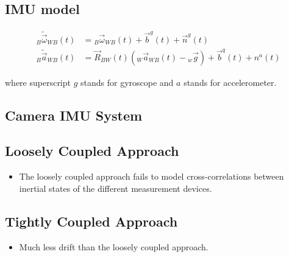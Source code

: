 \documentclass[10pt,a4paper]{scrartcl}
\begin{document}
\begin{multicols*}{2}
\subsection{IMU model}

\begin{align*}
{}_B\tilde{\vec{\omega}}_{WB}(t)&={}_B\vec{\omega}_{WB}(t)+\vec{b}^g(t)+\vec{n}^g(t)\\
{}_B\tilde{\vec{a}}_{WB}(t)&=\vec{R}_{BW}(t)({}_W\vec{a}_{WB}(t)-{}_w\vec{g})+\vec{b}^q(t)+n^a(t)
\end{align*}

where superscript $g$ stands for gyroscope and $a$ stands for accelerometer.


\subsection{Camera IMU System}



\subsection{Loosely Coupled Approach}


\begin{itemize}
\item The loosely coupled approach fails to model cross-correlations between inertial states of the different measurement devices.
\end{itemize}


\subsection{Tightly Coupled Approach}


\begin{itemize}
\item Much less drift than the loosely coupled approach.
\end{itemize}


\end{multicols*}
\end{document}
